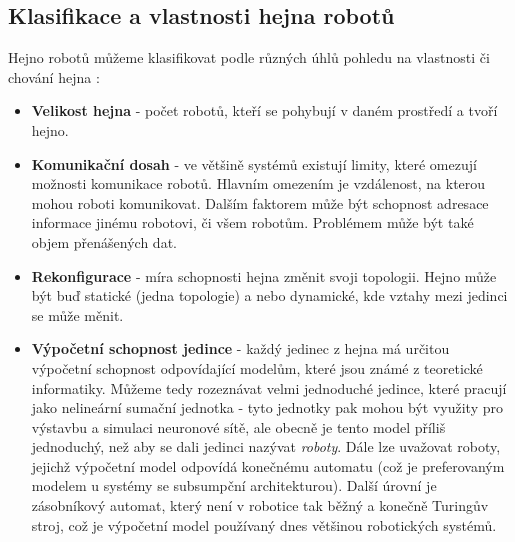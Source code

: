 \documentclass[a4paper,12pt]{article}
\begin{document}
\subsection{Klasifikace a vlastnosti hejna robotů}
Hejno robotů můžeme klasifikovat podle různých úhlů pohledu na vlastnosti
či chování hejna \cite{Dudek93}:
\begin{itemize}
  \item {\bf Velikost hejna} {- počet robotů, kteří se pohybují v daném prostředí a tvoří hejno.}
  \item {\bf Komunikační dosah} {- ve většině systémů existují limity, které omezují
     možnosti komunikace robotů. Hlavním omezením je vzdálenost, na kterou mohou
     roboti komunikovat. Dalším faktorem může být schopnost adresace informace
     jinému robotovi, či všem robotům. Problémem může být také objem přenášených dat.}
  \item {\bf Rekonfigurace} {- míra schopnosti hejna změnit svoji topologii. Hejno může být buď
     statické (jedna topologie) a nebo dynamické, kde vztahy mezi jedinci se může měnit.}
  \item {\bf Výpočetní schopnost jedince} {- každý jedinec z hejna má určitou výpočetní schopnost
     odpovídající modelům, které jsou známé z teoretické informatiky. Můžeme tedy rozeznávat
     velmi jednoduché jedince, které pracují jako nelineární sumační jednotka - tyto jednotky
     pak mohou být využity pro výstavbu a simulaci neuronové sítě, ale obecně je tento model
     příliš jednoduchý, než aby se dali jedinci nazývat {\it roboty}. Dále lze uvažovat
     roboty, jejichž výpočetní model odpovídá konečnému automatu (což je preferovaným modelem
     u systémy se subsumpční architekturou). Další úrovní je zásobníkový automat, který není
     v robotice tak běžný a konečně Turingův stroj, což je výpočetní model používaný dnes
     většinou robotických systémů.}
\end{itemize}
\end{document}
